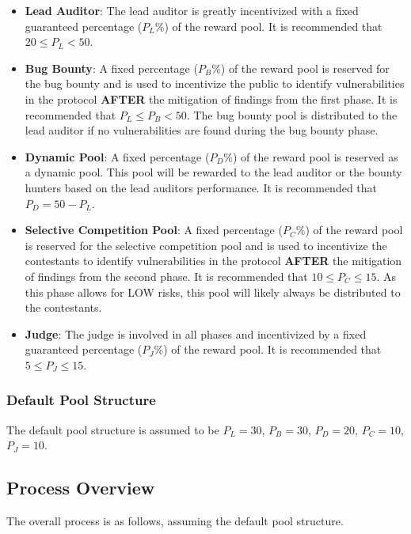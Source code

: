 \documentclass[10pt]{extarticle}
\def\tightlist{}
\begin{document}
\begin{itemize}
\tightlist
\item
  \textbf{Lead Auditor}: The lead auditor is greatly incentivized with a
  fixed guaranteed percentage (\(P_L\%\)) of the reward pool. It is
  recommended that \(20 \leq P_L < 50\).
\item
  \textbf{Bug Bounty}: A fixed percentage (\(P_B\%\)) of the reward pool
  is reserved for the bug bounty and is used to incentivize the public
  to identify vulnerabilities in the protocol \textbf{AFTER} the
  mitigation of findings from the first phase. It is recommended that
  \(P_L \leq P_B < 50\). The bug bounty pool is distributed to the lead
  auditor if no vulnerabilities are found during the bug bounty phase.
\item
  \textbf{Dynamic Pool}: A fixed percentage (\(P_D\%\)) of the reward
  pool is reserved as a dynamic pool. This pool will be rewarded to the
  lead auditor or the bounty hunters based on the lead
  auditor\textquotesingle s performance. It is recommended that
  \(P_D = 50 - P_L\).
\item
  \textbf{Selective Competition Pool}: A fixed percentage (\(P_C\%\)) of
  the reward pool is reserved for the selective competition pool and is
  used to incentivize the contestants to identify vulnerabilities in the
  protocol \textbf{AFTER} the mitigation of findings from the second
  phase. It is recommended that \(10 \leq P_C \leq 15\). As this phase
  allows for LOW risks, this pool will likely always be distributed to
  the contestants.
\item
  \textbf{Judge}: The judge is involved in all phases and incentivized
  by a fixed guaranteed percentage (\(P_J\%\)) of the reward pool. It is
  recommended that \(5 \leq P_J \leq 15\).
\end{itemize}

\subsubsection{Default Pool Structure}\label{default-pool-structure}

The default pool structure is assumed to be \(P_L=30\), \(P_B=30\),
\(P_D=20\), \(P_C=10\), \(P_J=10\).

\subsection{ Process Overview}\label{45-process-overview}

The overall process is as follows, assuming the default pool structure.
\end{document}
